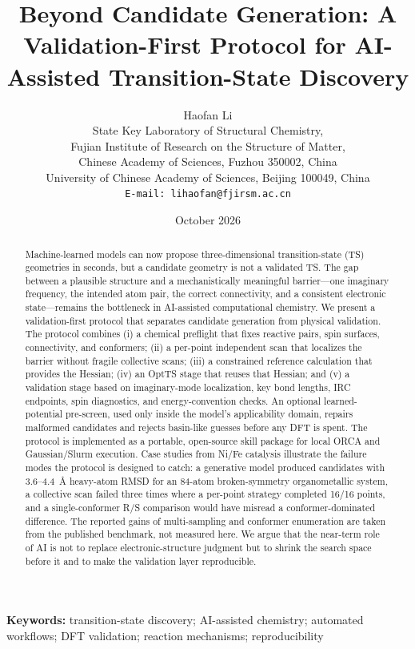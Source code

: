 \documentclass[11pt,a4paper]{article}
\title{\bfseries Beyond Candidate Generation: A Validation-First Protocol for AI-Assisted Transition-State Discovery}
\author{
Haofan Li\\[3pt]
\small State Key Laboratory of Structural Chemistry,\\
\small Fujian Institute of Research on the Structure of Matter,\\
\small Chinese Academy of Sciences, Fuzhou 350002, China\\
\small University of Chinese Academy of Sciences, Beijing 100049, China\\
\small \texttt{E-mail: lihaofan@fjirsm.ac.cn}
}
\date{October 2026}
\begin{document}
\maketitle

\begin{abstract}
\sloppy
Machine-learned models can now propose three-dimensional transition-state (TS) geometries in seconds, but a candidate geometry is not a validated TS. The gap between a plausible structure and a mechanistically meaningful barrier---one imaginary frequency, the intended atom pair, the correct connectivity, and a consistent electronic state---remains the bottleneck in AI-assisted computational chemistry. We present a validation-first protocol that separates candidate generation from physical validation. The protocol combines (i) a chemical preflight that fixes reactive pairs, spin surfaces, connectivity, and conformers; (ii) a per-point independent scan that localizes the barrier without fragile collective scans; (iii) a constrained reference calculation that provides the Hessian; (iv) an OptTS stage that reuses that Hessian; and (v) a validation stage based on imaginary-mode localization, key bond lengths, IRC endpoints, spin diagnostics, and energy-convention checks. An optional learned-potential pre-screen, used only inside the model's applicability domain, repairs malformed candidates and rejects basin-like guesses before any DFT is spent. The protocol is implemented as a portable, open-source skill package for local ORCA and Gaussian/Slurm execution. Case studies from Ni/Fe catalysis illustrate the failure modes the protocol is designed to catch: a generative model produced candidates with 3.6--4.4~\AA{} heavy-atom RMSD for an 84-atom broken-symmetry organometallic system, a collective scan failed three times where a per-point strategy completed 16/16 points, and a single-conformer R/S comparison would have misread a conformer-dominated difference. The reported gains of multi-sampling and conformer enumeration are taken from the published benchmark, not measured here. We argue that the near-term role of AI is not to replace electronic-structure judgment but to shrink the search space before it and to make the validation layer reproducible.
\end{abstract}

{\raggedright \noindent\textbf{Keywords:} transition-state discovery; AI-assisted chemistry; automated workflows; DFT validation; reaction mechanisms; reproducibility\par}
\end{document}

